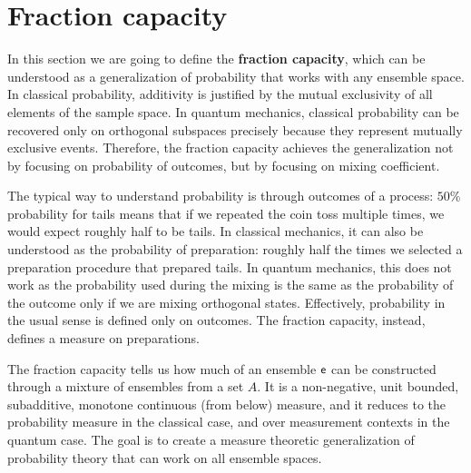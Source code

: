 \section{Fraction capacity}

In this section we are going to define the \textbf{fraction capacity}, which can be understood as a generalization of probability that works with any ensemble space. In classical probability, additivity is justified by the mutual exclusivity of all elements of the sample space. In quantum mechanics, classical probability can be recovered only on orthogonal subspaces precisely because they represent mutually exclusive events. Therefore, the fraction capacity achieves the generalization not by focusing on probability of outcomes, but by focusing on mixing coefficient.


The typical way to understand probability is through outcomes of a process: $50\%$ probability for tails means that if we repeated the coin toss multiple times, we would expect roughly half to be tails. In classical mechanics, it can also be understood as the probability of preparation: roughly half the times we selected a preparation procedure that prepared tails. In quantum mechanics, this does not work as the probability used during the mixing is the same as the probability of the outcome only if we are mixing orthogonal states. Effectively, probability in the usual sense is defined only on outcomes. The fraction capacity, instead, defines a measure on preparations.

The fraction capacity tells us how much of an ensemble $\mathsf{e}$ can be constructed through a mixture of ensembles from a set $A$. It is a non-negative, unit bounded, subadditive, monotone continuous (from below) measure, and it reduces to the probability measure in the classical case, and over measurement contexts in the quantum case. The goal is to create a measure theoretic generalization of probability theory that can work on all ensemble spaces.

